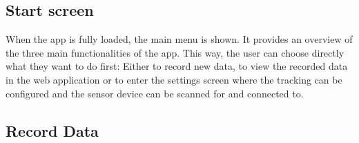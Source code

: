 \subsection{Start screen}

\begin{minipage}{0.45\textwidth}
When the app is fully loaded, the main menu is shown. It provides an overview of the three main functionalities of the app. This way, the user can choose directly what they want to do first:
Either to record new data, to view the recorded data in the web application or to enter the settings screen where the tracking can be configured and the sensor device can be scanned for and connected to.
\end{minipage} \hfill
\begin{minipage}{0.5\textwidth}
\end{minipage}

\subsection{Record Data}

